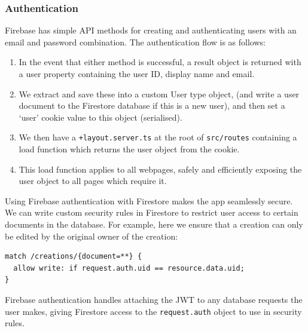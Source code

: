 \documentclass[12pt,a4paper]{article}
\begin{document}
\subsubsection{Authentication}
Firebase has simple API methods for creating and authenticating users with an email and password combination. The authentication flow is as follows:
\begin{enumerate}
    \item In the event that either method is successful, a result object is returned with a user property containing the user ID, display name and email.
    \item We extract and save these into a custom User type object, (and write a user document to the Firestore database if this is a new user), and then set a `user' cookie value to this object (serialised).
    \item We then have a \verb|+layout.server.ts| at the root of \verb|src/routes| containing a load function which returns the user object from the cookie.
    \item  This load function applies to all webpages, safely and efficiently exposing the user object to all pages which require it.
\end{enumerate}
Using Firebase authentication with Firestore makes the app seamlessly secure. We can write custom security rules in Firestore to restrict user access to certain documents in the database. For example, here we ensure that a creation can only be edited by the original owner of the creation:
\begin{lstlisting}
match /creations/{document=**} {
  allow write: if request.auth.uid == resource.data.uid;
}
\end{lstlisting}
Firebase authentication handles attaching the JWT to any database requests the user makes, giving Firestore access to the \verb|request.auth| object to use in security rules.
\end{document}
